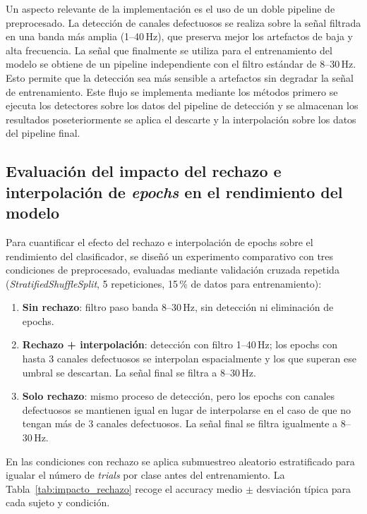 Un aspecto relevante de la implementación es el uso de un doble pipeline de preprocesado. La detección de canales defectuosos se realiza sobre la señal filtrada en una banda más amplia (1--40\,Hz), que preserva mejor los artefactos de baja y alta frecuencia. La señal que finalmente se utiliza para el entrenamiento del modelo se obtiene de un pipeline independiente con el filtro estándar de 8--30\,Hz. Esto permite que la detección sea más sensible a artefactos sin degradar la señal de entrenamiento. Este flujo se implementa mediante los métodos primero se ejecuta los detectores sobre los datos del pipeline de detección y se almacenan los resultados poseteriormente se aplica el descarte y la interpolación sobre los datos del pipeline final.

\subsection{Evaluación del impacto del rechazo e interpolación de \textit{epochs} en el rendimiento del modelo}
\label{subsec:evaluacion_impacto_epochs}

Para cuantificar el efecto del rechazo e interpolación de epochs sobre el rendimiento del clasificador, se diseñó un experimento comparativo con tres condiciones de preprocesado, evaluadas mediante validación cruzada repetida (\textit{StratifiedShuffleSplit}, 5 repeticiones, 15\,\% de datos para entrenamiento):

\begin{enumerate}
    \item \textbf{Sin rechazo}: filtro paso banda 8--30\,Hz, sin detección ni eliminación de epochs.
    \item \textbf{Rechazo + interpolación}: detección con filtro 1--40\,Hz; los epochs con hasta 3 canales defectuosos se interpolan espacialmente y los que superan ese umbral se descartan. La señal final se filtra a 8--30\,Hz.
    \item \textbf{Solo rechazo}: mismo proceso de detección, pero los epochs con canales defectuosos se mantienen igual en lugar de interpolarse en el caso de que no tengan más de 3 canales defectuosos. La señal final se filtra igualmente a 8--30\,Hz.
\end{enumerate}

En las condiciones con rechazo se aplica submuestreo aleatorio estratificado para igualar el número de \textit{trials} por clase antes del entrenamiento. La Tabla~\ref{tab:impacto_rechazo} recoge el accuracy medio $\pm$ desviación típica para cada sujeto y condición.

